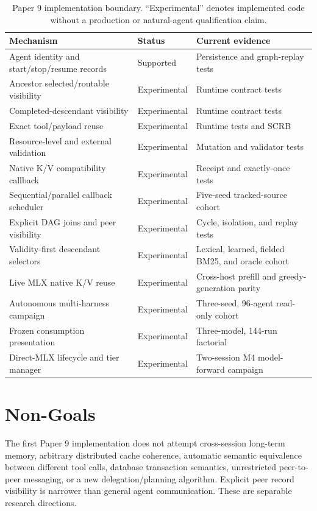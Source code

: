 \documentclass[11pt]{article}
\begin{document}
\begin{table}[H]
\centering
\small
\caption{Paper 9 implementation boundary. ``Experimental'' denotes implemented
code without a production or natural-agent qualification claim.}
\label{tab:implementation-status}
\begin{tabular}{>{\raggedright\arraybackslash}p{.42\linewidth}>{\raggedright\arraybackslash}p{.20\linewidth}>{\raggedright\arraybackslash}p{.28\linewidth}}
\toprule
Mechanism & Status & Current evidence \\
\midrule
Agent identity and start/stop/resume records & Supported & Persistence and graph-replay tests \\
Ancestor selected/routable visibility & Experimental & Runtime contract tests \\
Completed-descendant visibility & Experimental & Runtime contract tests \\
Exact tool/payload reuse & Experimental & Runtime tests and SCRB \\
Resource-level and external validation & Experimental & Mutation and validator tests \\
Native K/V compatibility callback & Experimental & Receipt and exactly-once tests \\
Sequential/parallel callback scheduler & Experimental & Five-seed tracked-source cohort \\
Explicit DAG joins and peer visibility & Experimental & Cycle, isolation, and replay tests \\
Validity-first descendant selectors & Experimental & Lexical, learned, fielded BM25, and oracle cohort \\
Live MLX native K/V reuse & Experimental & Cross-host prefill and greedy-generation parity \\
Autonomous multi-harness campaign & Experimental & Three-seed, 96-agent read-only cohort \\
Frozen consumption presentation & Experimental & Three-model, 144-run factorial \\
Direct-MLX lifecycle and tier manager & Experimental & Two-session M4 model-forward campaign \\
\bottomrule
\end{tabular}
\end{table}

\section{Non-Goals}

The first Paper 9 implementation does not attempt cross-session long-term
memory, arbitrary distributed cache coherence, automatic semantic equivalence
between different tool calls, database transaction semantics, unrestricted
peer-to-peer messaging, or a new delegation/planning algorithm. Explicit peer
record visibility is narrower than general agent communication. These are
separable research directions.
\end{document}
